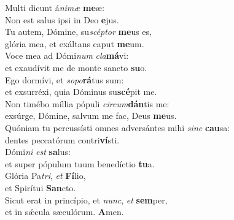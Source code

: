 \evenverse Multi dicunt á\textit{ni}\textit{mæ} \textbf{me}æ:~\*\\
\evenverse Non est salus ipsi in Deo \textbf{e}jus.\\
\oddverse Tu autem, Dómine, su\textit{scép}\textit{tor} \textbf{me}us es,~\*\\
\oddverse glória mea, et exáltans caput \textbf{me}um.\\
\evenverse Voce mea ad Dómi\textit{num} \textit{cla}\textbf{má}vi:~\*\\
\evenverse et exaudívit me de monte sancto \textbf{su}o.\\
\oddverse Ego dormívi, et \textit{so}\textit{po}\textbf{rá}tus sum:~\*\\
\oddverse et exsurréxi, quia Dóminus su\textbf{scé}pit me.\\
\evenverse Non timébo míllia pópuli \textit{cir}\textit{cum}\textbf{dán}tis me:~\*\\
\evenverse exsúrge, Dómine, salvum me fac, Deus \textbf{me}us.\\
\oddverse Quóniam tu percussísti omnes adversántes mihi \textit{si}\textit{ne} \textbf{cau}sa:~\*\\
\oddverse dentes peccatórum contri\textbf{ví}sti.\\
\evenverse Dómi\textit{ni} \textit{est} \textbf{sa}lus:~\*\\
\evenverse et super pópulum tuum benedíctio \textbf{tu}a.\\
\oddverse Glória Pa\textit{tri}, \textit{et} \textbf{Fí}lio,~\*\\
\oddverse et Spirítui \textbf{San}cto.\\
\evenverse Sicut erat in princípio, et \textit{nunc}, \textit{et} \textbf{sem}per,~\*\\
\evenverse et in sǽcula sæculórum. \textbf{A}men.\\
